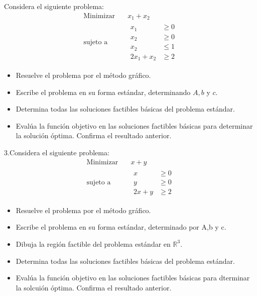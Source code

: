 \documentclass{article}
\begin{document}
Considera el siguiente problema:
\begin{equation*}
  \begin{aligned}
    \text{Minimizar}\quad  &   x_1+x_2 \\
    \text{sujeto a}\quad   &
    \begin{aligned}
      x_1     & \geq 0 \\
      x_2     & \geq 0 \\
      x_2     & \leq 1 \\
      2x_1+x_2  & \geq 2
    \end{aligned}
  \end{aligned}
\end{equation*}
\begin{itemize}
\item Resuelve el problema por el método gráfico.
\item Escribe el problema en su forma estándar, determinando $A, b$ y $c$.
\item Determina todas las soluciones factibles básicas del problema estándar.
\item Evalúa la función objetivo en las soluciones factibles básicas para determinar la solución óptima. Confirma el resultado anterior. 
\end{itemize}


3.Considera el siguiente problema:
\begin{equation*}
  \begin{aligned}
    \text{Minimizar}\quad & x+y \\
    \text{sujeto a}\quad &
    \begin{aligned}
      x & \geq 0 \\
      y & \geq 0 \\
      2x+y & \geq 2
    \end{aligned}
  \end{aligned}
\end{equation*}

\begin{itemize}
\item Resuelve el problema por el método gráfico.
\item Escribe el problema en su forma estándar, determinado por A,b y c.
\item Dibuja la región factible del problema estándar en $\mathbb{R}^3$.
\item Determina todas  las soluciones factibles básicas del problema estándar.
\item Evalúa la función objetivo en las soluciones factibles básicas para dterminar la solcuión óptima. Confirma el resultado anterior.
\end{itemize}
\end{document}
